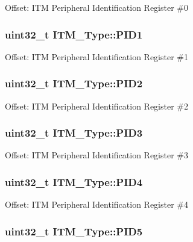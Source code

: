 Offset\-: I\-T\-M Peripheral Identification Register \#0 \hypertarget{struct_i_t_m___type_a30e87ec6f93ecc9fe4f135ca8b068990}{
\subsubsection[{P\-I\-D1}]{ uint32\-\_\-t I\-T\-M\-\_\-\-Type\-::\-P\-I\-D1}}\label{struct_i_t_m___type_a30e87ec6f93ecc9fe4f135ca8b068990}
Offset\-: I\-T\-M Peripheral Identification Register \#1 \hypertarget{struct_i_t_m___type_ae139d2e588bb382573ffcce3625a88cd}{
\subsubsection[{P\-I\-D2}]{ uint32\-\_\-t I\-T\-M\-\_\-\-Type\-::\-P\-I\-D2}}\label{struct_i_t_m___type_ae139d2e588bb382573ffcce3625a88cd}
Offset\-: I\-T\-M Peripheral Identification Register \#2 \hypertarget{struct_i_t_m___type_af006ee26c7e61c9a3712a80ac74a6cf3}{
\subsubsection[{P\-I\-D3}]{ uint32\-\_\-t I\-T\-M\-\_\-\-Type\-::\-P\-I\-D3}}\label{struct_i_t_m___type_af006ee26c7e61c9a3712a80ac74a6cf3}
Offset\-: I\-T\-M Peripheral Identification Register \#3 \hypertarget{struct_i_t_m___type_accfc7de00b0eaba0301e8f4553f70512}{
\subsubsection[{P\-I\-D4}]{ uint32\-\_\-t I\-T\-M\-\_\-\-Type\-::\-P\-I\-D4}}\label{struct_i_t_m___type_accfc7de00b0eaba0301e8f4553f70512}
Offset\-: I\-T\-M Peripheral Identification Register \#4 \hypertarget{struct_i_t_m___type_a9353055ceb7024e07d59248e54502cb9}{
\subsubsection[{P\-I\-D5}]{ uint32\-\_\-t I\-T\-M\-\_\-\-Type\-::\-P\-I\-D5}}\label{struct_i_t_m___type_a9353055ceb7024e07d59248e54502cb9}
